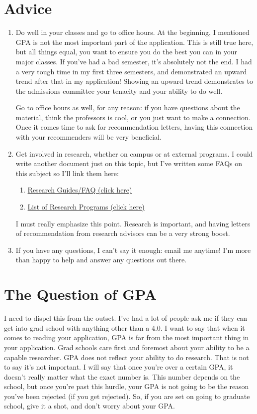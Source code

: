 \documentclass[12pt]{article}
\begin{document}
\section{Advice}
\begin{enumerate}
\item Do well in your classes and go to office hours. At the beginning, I mentioned GPA is not the most important part of the application. This is still true here, but all things equal, you want to ensure you do the best you can in your major classes. If you've had a bad semester, it's absolutely not the end. I had a very tough time in my first three semesters, and demonstrated an upward trend after that in my application! Showing an upward trend demonstrates to the admissions committee your tenacity and your ability to do well.

Go to office hours as well, for any reason: if you have questions about the material, think the professors is cool, or you just want to make a connection. Once it comes time to ask for recommendation letters, having this connection with your recommenders will be very beneficial.

\item Get involved in research, whether on campus or at external programs. I could write another document just on this topic, but I've written some FAQs on this subject so I'll link them here:
\begin{enumerate}
\item \href{https://spsyale.sites.yale.edu/research-guidefaq}{Research Guides/FAQ (click here)}
\item \href{https://spsyale.sites.yale.edu/resources}{List of Research Programs (click here)}
\end{enumerate}
I must really emphasize this point. Research is important, and having letters of recommendation from research advisors can be a very strong boost.

\item If you have any questions, I can't say it enough: email me anytime! I'm more than happy to help and answer any questions out there.
\end{enumerate}

\section{The Question of GPA}
I need to dispel this from the outset. I've had a lot of people ask me if they can get into grad school with anything other than a 4.0. I want to say that when it comes to reading your application, GPA is far from the most important thing in your application. Grad schools care first and foremost about your ability to be a capable researcher. GPA does not reflect your ability to do research. That is not to say it's not important. I will say that once you're over a certain GPA, it doesn't really matter what the exact number is. This number depends on the school, but once you're past this hurdle, your GPA is not going to be the reason you've been rejected (if you get rejected). So, if you are set on going to graduate school, give it a shot, and don't worry about your GPA.
\end{document}
